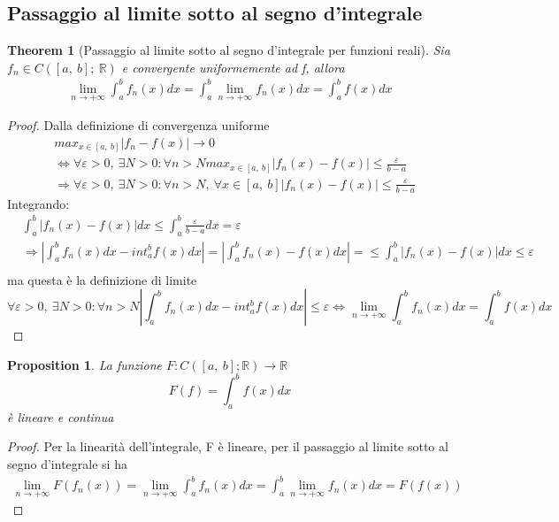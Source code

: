 \documentclass[10pt,a4paper]{article}
\newtheorem{theorem}{Theorem}
\newtheorem{proof}{Proof}
\newtheorem{prop}{Proposition}
\begin{document}
\subsection{Passaggio al limite sotto al segno d'integrale}
\begin{theorem}[Passaggio al limite sotto al segno d'integrale per funzioni reali]
Sia \(f_n\in C([a,\ b];\ \mathbb{R})\) e convergente uniformemente ad f, allora
	\begin{align*}
		\lim_{n\to+\infty}\int_{a}^{b}f_n(x)dx = \int_{a}^{b}\lim_{n\to+\infty}f_n(x)dx = \int_{a}^{b}f(x)dx
	\end{align*}
\end{theorem}
\begin{proof}
Dalla definizione di convergenza uniforme
\begin{align*}
	&max_{x\in[a,\ b]}|f_n-f(x)|\to 0\\
	&\Leftrightarrow \forall \varepsilon>0,\ \exists N>0:\forall n>N max_{x\in[a,\ b]}|f_n(x)-f(x)|\leq \frac{\varepsilon}{b-a}\\
	&\Rightarrow \forall \varepsilon>0,\ \exists N>0:\forall n>N,\ \forall x\in[a,\ b] |f_n(x)-f(x)|\leq \frac{\varepsilon}{b-a}
\end{align*}
Integrando:
\begin{align*}
	&\int_{a}^{b}|f_n(x)-f(x)|dx\leq \int_{a}^{b}\frac{\varepsilon}{b-a}dx=\varepsilon\\
	&\Rightarrow |\int_{a}^{b}f_n(x)dx-int_{a}^{b}f(x)dx|=|\int_{a}^{b}f_n(x)-f(x)dx|=\leq\int_{a}^{b}|f_n(x)-f(x)|dx\leq\varepsilon\\
\end{align*}
ma questa è la definizione di limite 
\[\forall\varepsilon>0,\ \exists N>0:\forall n>N |\int_{a}^{b}f_n(x)dx-int_{a}^{b}f(x)dx|\leq\varepsilon\Leftrightarrow \lim_{n\to+\infty}\int_{a}^{b}f_n(x)dx = \int_{a}^{b}f(x)dx \]
\end{proof}

\begin{prop}
	La funzione \(F: C([a,\ b]; \mathbb{R})\to\mathbb{R}\)
	\[F(f) = \int_{a}^{b}f(x)dx\]
	è lineare e continua
\end{prop}

\begin{proof}
	Per la linearità dell'integrale, F è lineare, per il passaggio al limite sotto al segno d'integrale si ha 
	\begin{align*}
		\lim_{n\to+\infty} F(f_n(x))= \lim_{n\to+\infty} \int_{a}^{b}f_n(x)dx = \int_{a}^{b}\lim_{n\to+\infty}f_n(x)dx = F(f(x))
	\end{align*}
\end{proof}
\end{document}
